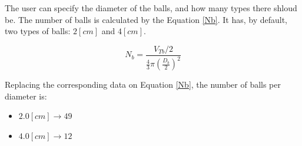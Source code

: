 The user can specify the diameter of the balls, and how many types there shloud be. The number of balls is calculated by the Equation \ref{Nb}. It has, by default, two types of balls: $2 [cm]$ and $4 [cm]$.

\begin{equation}
        N_b = \frac{V_{Tb}/2}{\frac{4}{3}\pi \left(\frac{D_b}{2} \right) ^2}
        \tag{9}
        \label{Nb}
\end{equation}

Replacing the corresponding data on Equation \ref{Nb}, the number of balls per diameter is:

\begin{itemize}
	\item $2.0[cm] \rightarrow 49$
	\item $4.0[cm] \rightarrow 12$
\end{itemize}